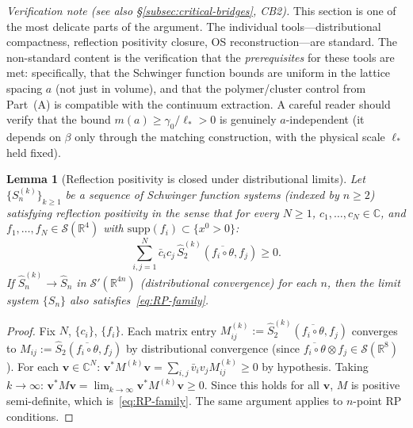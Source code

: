 \documentclass[11pt]{article}
\newtheorem{lemma}[theorem]{Lemma}
\theoremstyle{definition}
\newcommand{\R}{\mathbb{R}}
\begin{document}
\emph{Verification note (see also \S\ref{subsec:critical-bridges},
CB2).}
This section is one of the most delicate parts of the argument.
The individual tools---distributional compactness, reflection
positivity closure, OS reconstruction---are standard.  The
non-standard content is the verification that the
\emph{prerequisites} for these tools are met: specifically,
that the Schwinger function bounds are uniform in the lattice
spacing $a$ (not just in volume), and that the polymer/cluster
control from Part~(A) is compatible with the continuum extraction.
A careful reader should verify that the bound
$m(a)\ge\gamma_0/\ell_*>0$ is genuinely $a$-independent
(it depends on $\beta$ only through the matching construction,
with the physical scale $\ell_*$ held fixed).

\begin{lemma}[Reflection positivity is closed under
distributional limits]\label{lem:RP-closed}
Let $\{S_n^{(k)}\}_{k\ge 1}$ be a sequence of
Schwinger function systems (indexed by $n\ge 2$) satisfying
reflection positivity in the sense that for every $N\ge 1$,
$c_1,\ldots,c_N\in\mathbb{C}$, and
$f_1,\ldots,f_N\in\mathcal{S}(\R^4)$ with
$\mathrm{supp}(f_i)\subset\{x^0>0\}$:
\begin{equation}\label{eq:RP-family}
\sum_{i,j=1}^N\bar c_i c_j\,
\hat S_2^{(k)}(\overline{f_i\circ\theta},f_j)\ge 0.
\end{equation}
If $\hat S_n^{(k)}\to\hat S_n$ in $\mathcal{S}'(\R^{4n})$
(distributional convergence) for each $n$, then the limit
system $\{S_n\}$ also satisfies~\eqref{eq:RP-family}.
\end{lemma}

\begin{proof}
Fix $N$, $\{c_i\}$, $\{f_i\}$.  Each matrix entry
$M_{ij}^{(k)}:=\hat S_2^{(k)}(\overline{f_i\circ\theta},f_j)$
converges to $M_{ij}:=\hat S_2(\overline{f_i\circ\theta},f_j)$
by distributional convergence (since
$\overline{f_i\circ\theta}\otimes f_j\in\mathcal{S}(\R^8)$).
For each $\mathbf{v}\in\mathbb{C}^N$:
$\mathbf{v}^*M^{(k)}\mathbf{v}
=\sum_{i,j}\bar v_i v_j M_{ij}^{(k)}\ge 0$
by hypothesis.  Taking $k\to\infty$:
$\mathbf{v}^*M\mathbf{v}
=\lim_{k\to\infty}\mathbf{v}^*M^{(k)}\mathbf{v}\ge 0$.
Since this holds for all $\mathbf{v}$, $M$ is positive
semi-definite, which is~\eqref{eq:RP-family}.
The same argument applies to $n$-point RP conditions.
\end{proof}
\end{document}
